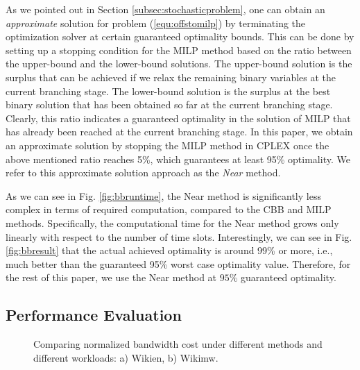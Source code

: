\documentclass[10pt,journal,compsoc]{IEEEtran}
\begin{document}
As we pointed out in Section \ref{subsec:stochasticproblem}, one can obtain an \emph{approximate} solution for problem (\ref{equ:offstomilp}) by terminating the optimization solver at certain guaranteed optimality bounds. This can be done by setting up a stopping condition for the MILP method based on the ratio between the upper-bound and the lower-bound solutions. The upper-bound solution is the surplus that can be achieved if we relax the remaining binary variables at the current branching stage. The lower-bound solution is the surplus at the best binary solution that has been obtained so far at the current branching stage. Clearly, this ratio indicates a guaranteed optimality in the  solution of MILP that has already been reached at the current branching stage. In this paper, we obtain an approximate solution by stopping the MILP method in CPLEX once the above mentioned ratio reaches 5\%, which guarantees at least 95\% optimality. We refer to this approximate solution approach as the \emph{Near} method.

As we can see in Fig. \ref{fig:bbruntime}, the Near method is significantly less  complex in terms of required computation,  compared to the CBB and MILP methods. Specifically, the computational time for the Near method grows only linearly with respect to the number of time slots. Interestingly, we can see in Fig. \ref{fig:bbresult} that the actual achieved optimality is around 99\% or more, i.e., much better than the guaranteed 95\% worst case optimality value.
Therefore, for the rest of this paper, we use the Near method at $95\%$ guaranteed optimality.







\subsection{Performance Evaluation}\label{subsec:performanceevaluation}

\begin{figure}[!t]
\centering
{}
\caption{Comparing normalized bandwidth cost under different methods and different workloads: a) Wikien, b) Wikimw.\vspace{-0.2cm}}\label{fig:bandwidthcost}
\end{figure}
\end{document}
